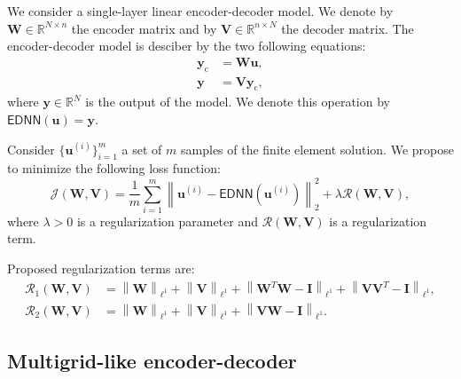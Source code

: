 We consider a single-layer linear encoder-decoder model.
We denote by \(\mathbf{W} \in \mathbb{R}^{N \times n}\) the encoder matrix and by \(\mathbf{V} \in \mathbb{R}^{n \times N}\) the decoder matrix.
The encoder-decoder model is desciber by the two following equations:
\begin{subequations}
    \begin{align}
        \mathbf{y}_\mathrm{c} & = \mathbf{W} \mathbf{u}, \\
        \mathbf{y} & = \mathbf{V} \mathbf{y}_\mathrm{c},
    \end{align}
\end{subequations}
where \(\mathbf{y} \in \mathbb{R}^{N}\) is the output of the model.
We denote this operation by \(\mathsf{EDNN}(\mathbf{u}) = \mathbf{y}\).

Consider \( \{ \mathbf{u}^{(i)} \}_{i=1}^{m} \) a set of \(m\) samples of the finite element solution.
We propose to minimize the following loss function:
\begin{equation}
    \mathcal{J}(\mathbf{W}, \mathbf{V}) =
    \frac{1}{m} \sum_{i=1}^{m} \left\| \mathbf{u}^{(i)} - \mathsf{EDNN}(\mathbf{u}^{(i)}) \right\|_2^2 +
    \lambda \mathcal{R}(\mathbf{W}, \mathbf{V}),
\end{equation}
where \(\lambda > 0\) is a regularization parameter and \(\mathcal{R}(\mathbf{W}, \mathbf{V})\) is a regularization term.

Proposed regularization terms are:
\begin{subequations}
    \begin{align}
        \mathcal{R}_1(\mathbf{W}, \mathbf{V}) &
        = \left\lVert \mathbf{W} \right\rVert_{\ell^1} + \left\lVert \mathbf{V} \right\rVert_{\ell^1}
        + \left\lVert \mathbf{W}^T \mathbf{W} - \mathbf{I} \right\rVert_{\ell^1}
        + \left\lVert \mathbf{V} \mathbf{V}^T - \mathbf{I} \right\rVert_{\ell^1}, \\
        \mathcal{R}_2(\mathbf{W}, \mathbf{V}) &
        = \left\lVert \mathbf{W} \right\rVert_{\ell^1} + \left\lVert \mathbf{V} \right\rVert_{\ell^1}
        + \left\lVert \mathbf{V} \mathbf{W} - \mathbf{I} \right\rVert_{\ell^1}.
    \end{align}
\end{subequations}

\subsection{Multigrid-like encoder-decoder}

